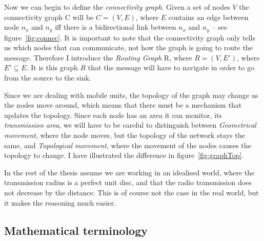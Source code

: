 
Now we can begin to define the \emph{connectivity graph}. Given a set of nodes $V$ the connectivity graph C will be $C = (V, E)$, where $E$ contains an edge between node $n_x$ and $n_y$ iff there is a bidirectional link between $n_x$ and $n_y$ -- see figure~\ref{fig:connec}. It is important to note that the connectivity graph only tells us which nodes that can communicate, not how the graph is going to route the message. Therefore I introduce the \emph{Routing Graph} R, where $R = (V, E\prime)$, where $E\prime \subseteq E$. It is this graph $R$ that the message will have to navigate in order to go from the source to the sink.


Since we are dealing with mobile units, the topology of the graph may change as the nodes move around, which means that there must be a mechanism that updates the topology. Since each node has an area it can monitor, its \emph{transmission area}, we will have to be careful to distinguish between \emph{Geometrical movement}, where the node moves, but the topology of the network stays the same, and \emph{Topological movement}, where the movement of the nodes causes the topology to change. I have illustrated the difference in figure~\ref{fig:graphTop}. 

In the rest of the thesis assume we are working in an idealised world, where the transmission radius is a perfect unit disc, and that the radio transmission does not decrease by the distance. This is of course not the case in the real world, but it makes the reasoning much easier.


\subsection{Mathematical terminology}
